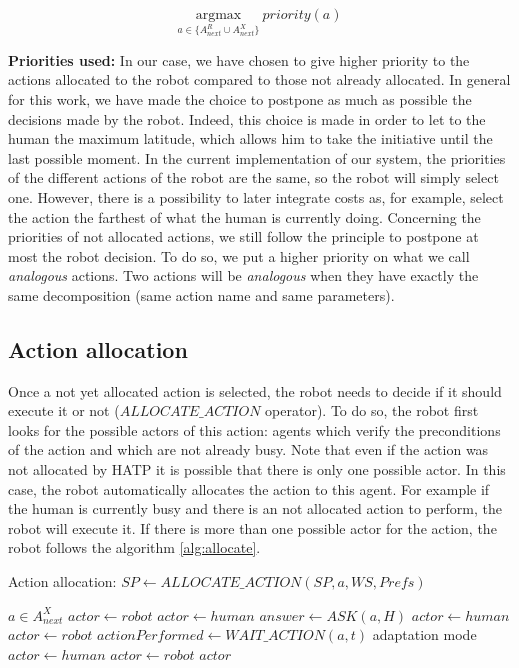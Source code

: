\documentclass[english,a4paper,11pt,twoside]{StyleThese}
\begin{document}
$$\underset{a \in \{A^R_{next} \cup A^X_{next}\}}{\mathrm{argmax}} \ priority(a)$$

\textbf{Priorities used:}
In our case, we have chosen to give higher priority to the actions allocated to the robot compared to those not already allocated. In general for this work, we have made the choice to postpone as much as possible the decisions made by the robot. Indeed, this choice is made in order to let to the human the maximum latitude, which allows him to take the initiative until the last possible moment. In the current implementation of our system, the priorities of the different actions of the robot are the same, so the robot will simply select one. However, there is a possibility to later integrate costs as, for example, select the action the farthest of what the human is currently doing. Concerning the priorities of not allocated actions, we still follow the principle to postpone at most the robot decision. To do so, we put a higher priority on what we call \textit{analogous} actions. Two actions will be \textit{analogous} when they have exactly the same decomposition (same action name and same parameters). 

\subsection{Action allocation}
\label{subsec:allocation}

Once a not yet allocated action is selected, the robot needs to decide if it should execute it or not ($ALLOCATE\_ACTION$ operator). To do so, the robot first looks for the possible actors of this action: agents which verify the preconditions of the action and which are not already busy. Note that even if the action was not allocated by HATP it is possible that there is only one possible actor. In this case, the robot automatically allocates the action to this agent. For example if the human is currently busy and there is an not allocated action  to perform, the robot will execute it. If there is more than one possible actor for the action, the robot follows the algorithm \ref{alg:allocate}.

\begin{algorithm}
\caption{Action allocation: $SP \leftarrow ALLOCATE\_ACTION(SP, a, WS, Prefs)$}
\label{alg:allocate}
\begin{algorithmic}
\REQUIRE $a \in A^X_{next}$
\STATE $actor \leftarrow robot$
\STATE $actor \leftarrow human$
\STATE $answer \leftarrow ASK(a, H)$
\STATE $actor \leftarrow human$
\ELSE
\STATE $actor \leftarrow robot$
\ENDIF
\ELSE
\STATE $actionPerformed \leftarrow WAIT\_ACTION(a, t)$
\COMMENT adaptation mode
\STATE $actor \leftarrow human$
\ELSE
\STATE $actor \leftarrow robot$
\ENDIF
\ENDIF
\RETURN $actor$
\end{algorithmic}
\end{algorithm}
\end{document}
